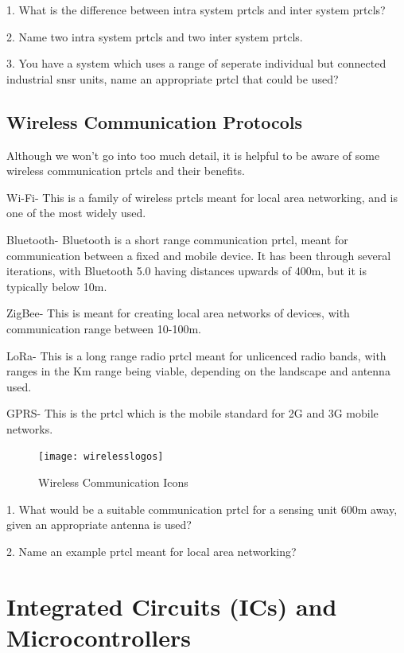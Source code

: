 \documentclass[a4paper,11pt]{report}
\newcommand{\Quiz}[1] %
{
\par\noindent %
\phantomsection %
\todo[inline, color=blue!30]{\textbf{#1}} %
\vspace{1em} %
}
\begin{document}
\Quiz{Quiz}

1. What is the difference between intra system \gls{prtcl}s and inter system \gls{prtcl}s?

2. Name two intra system \gls{prtcl}s and two inter system \gls{prtcl}s.

3. You have a system which uses a range of seperate individual but connected industrial \gls{snsr} units, name an appropriate \gls{prtcl} that could be used?

\vspace*{1\baselineskip}

\subsection{Wireless Communication Protocols}

Although we won't go into too much detail, it is helpful to be aware of some wireless communication \gls{prtcl}s and their benefits.

Wi-Fi- This is a family of wireless \gls{prtcl}s meant for local area networking, and is one of the most widely used.

Bluetooth- Bluetooth is a short range communication \gls{prtcl}, meant for communication between a fixed and mobile device. It has been through several iterations, with Bluetooth 5.0 having distances upwards of 400m, but it is typically below 10m.

ZigBee- This is meant for creating local area networks of devices, with communication range between 10-100m.

LoRa- This is a long range radio \gls{prtcl} meant for unlicenced radio bands, with ranges in the Km range being viable, depending on the landscape and antenna used.

GPRS- This is the \gls{prtcl} which is the mobile standard for 2G and 3G mobile networks.

\begin{figure}[H]
\centering
\texttt{[image: wirelesslogos]}
\caption{Wireless Communication Icons}
\end{figure}

\Quiz{Quiz}

1. What would be a suitable communication \gls{prtcl} for a sensing unit 600m away, given an appropriate antenna is used?

2. Name an example \gls{prtcl} meant for local area networking?

\pagebreak

\section{Integrated Circuits (ICs) and Microcontrollers}
\end{document}
